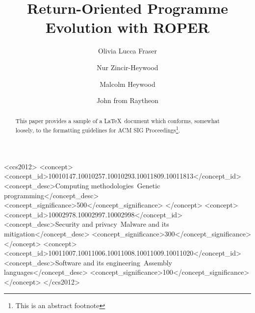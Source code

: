 \documentclass[sigconf]{acmart}
\begin{document}
\title{Return-Oriented Programme Evolution with ROPER}


\author{Olivia Lucca Fraser}

\author{Nur Zincir-Heywood}

\author{Malcolm Heywood}

\author{John from Raytheon}


\renewcommand{\shortauthors}{O. Fraser et al}


\begin{abstract}
This paper provides a sample of a \LaTeX\ document which conforms,
somewhat loosely, to the formatting guidelines for
ACM SIG Proceedings\footnote{This is an abstract footnote}. 
\end{abstract}

%
%
\begin{CCSXML}
 <ccs2012>
   <concept>
     <concept_id>10010147.10010257.10010293.10011809.10011813</concept_id>
     <concept_desc>Computing methodologies~Genetic programming</concept_desc>
     <concept_significance>500</concept_significance>
   </concept>
   <concept>
     <concept_id>10002978.10002997.10002998</concept_id>
     <concept_desc>Security and privacy~Malware and its mitigation</concept_desc>
     <concept_significance>300</concept_significance>
   </concept>
     <concept>
     <concept_id>10011007.10011006.10011008.10011009.10011020</concept_id>
     <concept_desc>Software and its engineering~Assembly languages</concept_desc>
   <concept_significance>100</concept_significance>
   </concept>
 </ccs2012>
\end{CCSXML}
\end{document}
